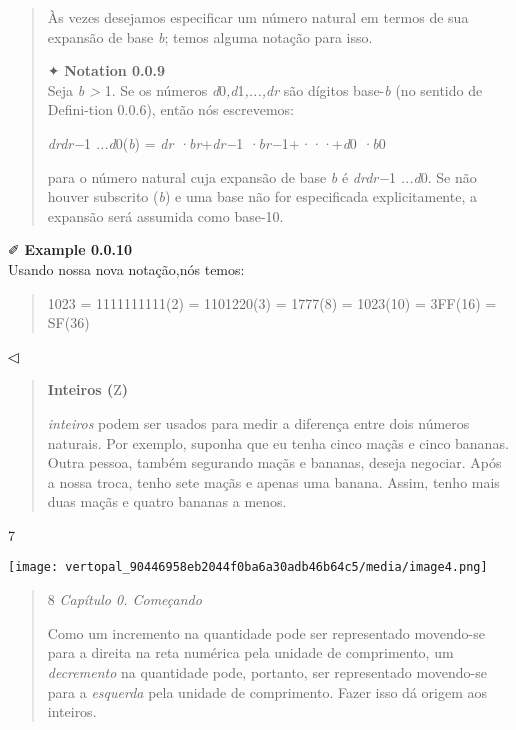 \documentclass[
]{article}
\begin{document}
\begin{quote}
Às vezes desejamos especificar um número natural em termos de sua
expansão de base \emph{b}; temos alguma notação para isso.

✦ \textbf{Notation 0.0.9}\\
Seja \emph{b \textgreater{}} 1. Se os números
\emph{d}0\emph{,d}1\emph{,...,dr} são dígitos base-\emph{b} (no sentido
de Defini-tion 0.0.6), então nós escrevemos:

\emph{drdr−}1 \emph{...d}0(\emph{b}) = \emph{dr ·br}+\emph{dr−}1
\emph{·br−}1+\emph{···}+\emph{d}0 \emph{·b}0

para o número natural cuja expansão de base \emph{b} é \emph{drdr−}1
\emph{...d}0. Se não houver subscrito (\emph{b}) e uma base não for
especificada explicitamente, a expansão será assumida como base-10.
\end{quote}

✐ \textbf{Example 0.0.10}\\
Usando nossa nova notação,nós temos:

\begin{quote}
1023 = 1111111111(2) = 1101220(3) = 1777(8) = 1023(10) = 3FF(16) =
SF(36)
\end{quote}

◁

\begin{quote}
\textbf{Inteiros (}Z\textbf{)}

\emph{inteiros} podem ser usados para medir a diferença entre dois
números naturais. Por exemplo, suponha que eu tenha cinco maçãs e cinco
bananas. Outra pessoa, também segurando maçãs e bananas, deseja
negociar. Após a nossa troca, tenho sete maçãs e apenas uma banana.
Assim, tenho mais duas maçãs e quatro bananas a menos.
\end{quote}

7

\texttt{[image: vertopal\_90446958eb2044f0ba6a30adb46b64c5/media/image4.png]}

\begin{quote}
8 \emph{Capítulo 0. Começando}

Como um incremento na quantidade pode ser representado movendo-se para a
direita na reta numérica pela unidade de comprimento, um
\emph{decremento} na quantidade pode, portanto, ser representado
movendo-se para a \emph{esquerda} pela unidade de comprimento. Fazer
isso dá origem aos inteiros.
\end{quote}
\end{document}
